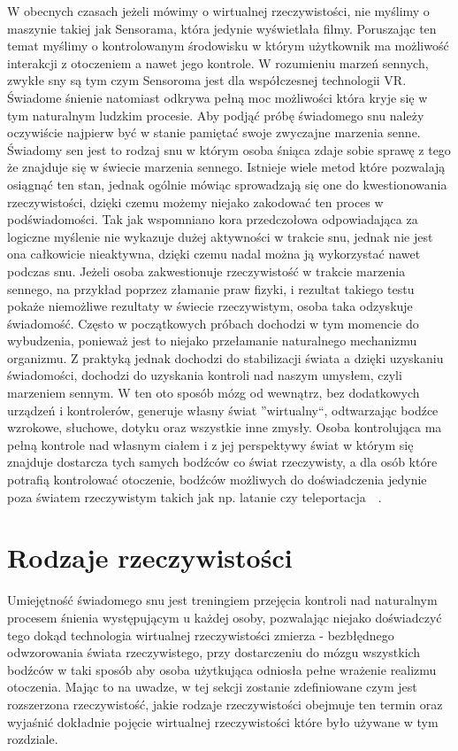 W obecnych czasach jeżeli mówimy o wirtualnej rzeczywistości, nie myślimy o maszynie takiej jak Sensorama, która jedynie wyświetlała filmy. Poruszając ten temat myślimy o kontrolowanym środowisku w którym użytkownik ma możliwość interakcji z otoczeniem a nawet jego kontrole. W rozumieniu marzeń sennych, zwykłe sny są tym czym Sensoroma jest dla współczesnej technologii VR. Świadome śnienie natomiast odkrywa pełną moc możliwości która kryje się w tym naturalnym ludzkim procesie. Aby podjąć próbę świadomego snu należy oczywiście najpierw być w stanie pamiętać swoje zwyczajne marzenia senne. Świadomy sen jest to rodzaj snu w którym osoba śniąca zdaje sobie sprawę z tego że znajduje się w świecie marzenia sennego. Istnieje wiele metod które pozwalają osiągnąć ten stan, jednak ogólnie mówiąc sprowadzają się one do kwestionowania rzeczywistości, dzięki czemu możemy niejako zakodować ten proces w podświadomości. Tak jak wspomniano kora przedczołowa odpowiadająca za logiczne myślenie nie wykazuje dużej aktywności w trakcie snu, jednak nie jest ona całkowicie nieaktywna, dzięki czemu nadal można ją wykorzystać nawet podczas snu. Jeżeli osoba zakwestionuje rzeczywistość w trakcie marzenia sennego, na przykład poprzez złamanie praw fizyki, i rezultat takiego testu pokaże niemożliwe rezultaty w świecie rzeczywistym, osoba taka odzyskuje świadomość. Często w początkowych próbach dochodzi w tym momencie do wybudzenia, ponieważ jest to niejako przełamanie naturalnego mechanizmu organizmu. Z praktyką jednak dochodzi do stabilizacji świata a dzięki uzyskaniu świadomości, dochodzi do uzyskania kontroli nad naszym umysłem, czyli marzeniem sennym. W ten oto sposób mózg od wewnątrz, bez dodatkowych urządzeń i kontrolerów, generuje własny świat ''wirtualny``, odtwarzając bodźce wzrokowe, słuchowe, dotyku oraz wszystkie inne zmysły. Osoba kontrolująca ma pełną kontrole nad własnym ciałem i z jej perspektywy świat w którym się znajduje dostarcza tych samych bodźców co świat rzeczywisty, a dla osób które potrafią kontrolować otoczenie, bodźców możliwych do doświadczenia jedynie poza światem rzeczywistym takich jak np. latanie czy teleportacja~\cite{sen2}~\cite{sen1}. 		
	
\section{Rodzaje rzeczywistości}
\label{sec:rodzaje}
Umiejętność świadomego snu jest treningiem przejęcia kontroli nad naturalnym procesem śnienia występującym u każdej osoby, pozwalając niejako doświadczyć tego dokąd technologia wirtualnej rzeczywistości zmierza - bezbłędnego odwzorowania świata rzeczywistego, przy dostarczeniu do mózgu wszystkich bodźców w taki sposób aby osoba użytkująca odniosła pełne wrażenie realizmu otoczenia. Mając to na uwadze, w tej sekcji zostanie zdefiniowane czym jest rozszerzona rzeczywistość, jakie rodzaje rzeczywistości obejmuje ten termin oraz wyjaśnić dokładnie pojęcie wirtualnej rzeczywistości które było używane w tym rozdziale. 

